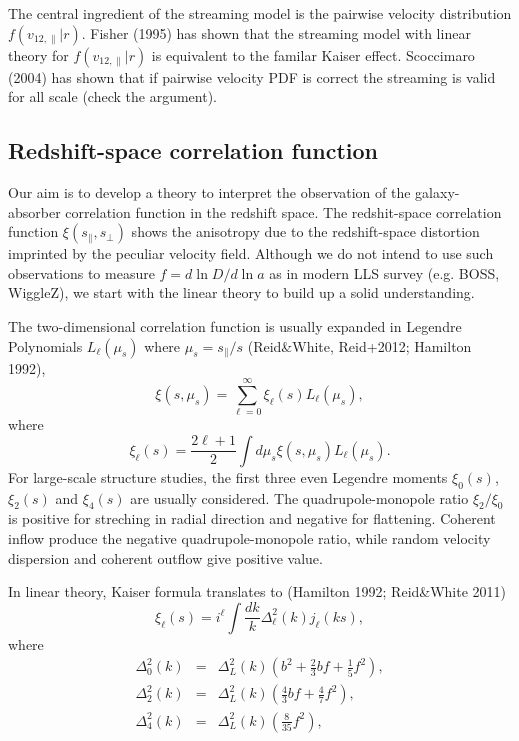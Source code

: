\documentclass[useAMS,usenatbib,twocolumn]{mn2e}
\begin{document}
The central ingredient of the streaming model is the pairwise velocity
distribution $f(v_{12,\parallel}|r)$. Fisher (1995) has shown that the streaming
model with linear theory for $f(v_{12,\parallel}|r)$ is equivalent to the familar
Kaiser effect. Scoccimaro (2004) has shown that if pairwise velocity PDF is 
correct the streaming is valid for all scale (check the argument).


\subsection{Redshift-space correlation function}
Our aim is to develop a theory to interpret the observation of the 
galaxy-absorber correlation function in the redshift space. 
The redshit-space correlation function $\xi(s_\parallel,s_\perp)$ shows the 
anisotropy due to the redshift-space distortion imprinted by the peculiar 
velocity field. Although we do not intend to use such observations to measure 
$f=d\ln D/d\ln a$ as in modern LLS survey (e.g. BOSS, WiggleZ), we start with 
the linear theory to build up a solid understanding.


The two-dimensional correlation function is usually expanded in Legendre
Polynomials $L_\ell(\mu_s)$ where $\mu_s=s_\parallel/s$ (Reid\&White, Reid+2012;
Hamilton 1992),
\begin{equation}
\xi(s,\mu_s)=\sum_{\ell=0}^\infty\xi_\ell(s)L_\ell(\mu_s),
\end{equation}
where
\begin{equation}
\xi_\ell(s)=\frac{2\ell+1}{2}\int d\mu_s \xi(s,\mu_s)L_\ell(\mu_s).
\end{equation}
For large-scale structure studies, the first three even Legendre moments
$\xi_0(s)$, $\xi_2(s)$ and $\xi_4(s)$ are usually considered. 
The quadrupole-monopole ratio $\xi_2/\xi_0$ is positive for streching
in radial direction and negative for flattening. Coherent inflow produce
the negative quadrupole-monopole ratio, while random velocity dispersion
and coherent outflow give positive value.


In linear theory, Kaiser formula translates to (Hamilton 1992; Reid\&White 2011)
\begin{equation}
\xi_\ell(s)=i^\ell\int\frac{dk}{k}\Delta^2_\ell(k)j_\ell(ks),
\end{equation}
where 
\begin{eqnarray}
\Delta^2_0(k)&=&\Delta^2_{L}(k)(b^2+\frac{2}{3}bf+\frac{1}{5}f^2), \\
\Delta^2_2(k)&=&\Delta^2_{L}(k)(\frac{4}{3}bf+\frac{4}{7}f^2), \\
\Delta^2_4(k)&=&\Delta^2_{L}(k)(\frac{8}{35}f^2),
\end{eqnarray}
\end{document}
